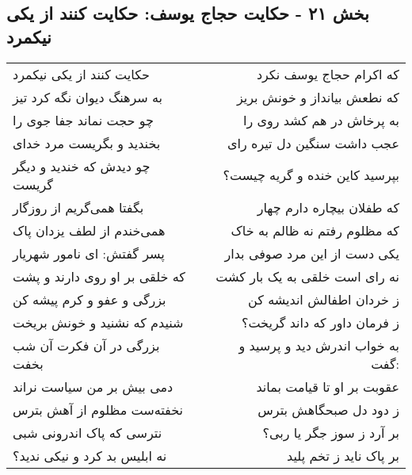 \begin{center}
\section*{بخش ۲۱ - حکایت حجاج یوسف: حکایت کنند از یکی نیکمرد}
\label{sec:021}
\begin{longtable}{l p{0.5cm} r}
حکایت کنند از یکی نیکمرد
&&
که اکرام حجاج یوسف نکرد
\\
به سرهنگ دیوان نگه کرد تیز
&&
که نطعش بیانداز و خونش بریز
\\
چو حجت نماند جفا جوی را
&&
به پرخاش در هم کشد روی را
\\
بخندید و بگریست مرد خدای
&&
عجب داشت سنگین دل تیره رای
\\
چو دیدش که خندید و دیگر گریست
&&
بپرسید کاین خنده و گریه چیست؟
\\
بگفتا همی‌گریم از روزگار
&&
که طفلان بیچاره دارم چهار
\\
همی‌خندم از لطف یزدان پاک
&&
که مظلوم رفتم نه ظالم به خاک
\\
پسر گفتش: ای نامور شهریار
&&
یکی دست از این مرد صوفی بدار
\\
که خلقی بر او روی دارند و پشت
&&
نه رای است خلقی به یک بار کشت
\\
بزرگی و عفو و کرم پیشه کن
&&
ز خردان اطفالش اندیشه کن
\\
شنیدم که نشنید و خونش بریخت
&&
ز فرمان داور که داند گریخت؟
\\
بزرگی در آن فکرت آن شب بخفت
&&
به خواب اندرش دید و پرسید و گفت:
\\
دمی بیش بر من سیاست نراند
&&
عقوبت بر او تا قیامت بماند
\\
نخفته‌ست مظلوم از آهش بترس
&&
ز دود دل صبحگاهش بترس
\\
نترسی که پاک اندرونی شبی
&&
بر آرد ز سوز جگر یا ربی؟
\\
نه ابلیس بد کرد و نیکی ندید؟
&&
بر پاک ناید ز تخم پلید
\\
\end{longtable}
\end{center}
